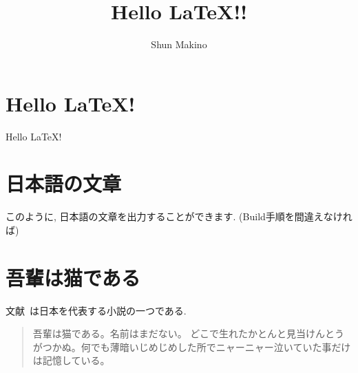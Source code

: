 \documentclass{ltjsarticle}
\begin{document}
\title{Hello \LaTeX!!}
\author{Shun Makino}
\date{}

\section{Hello \LaTeX!}
Hello \LaTeX!

\section{日本語の文章}
このように, 日本語の文章を出力することができます. (Build手順を間違えなければ)

\section{吾輩は猫である}
文献~\cite{neko}は日本を代表する小説の一つである.
\begin{quote}
    吾輩は猫である。名前はまだない。
    どこで生れたかとんと見当けんとうがつかぬ。何でも薄暗いじめじめした所でニャーニャー泣いていた事だけは記憶している。
\end{quote}



\end{document}
